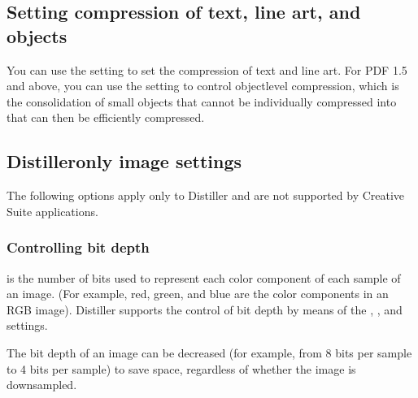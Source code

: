 \documentclass[letterpaper,12pt,english,openany,oneside]{sphinxmanual}
\begin{document}
\subsection{Setting compression of text, line art, and objects}
\label{\detokenize{PDF_Create_UsingSettings:setting-compression-of-text-line-art-and-objects}}
You can use the  setting to set the compression of text and line art. For PDF 1.5 and above, you can use the  setting to control object\sphinxhyphen{}level compression, which is the consolidation of small objects that cannot be individually compressed into  that can then be efficiently compressed.




\subsection{Distiller\sphinxhyphen{}only image settings}
\label{\detokenize{PDF_Create_UsingSettings:distiller-only-image-settings}}
The following options apply only to Distiller and are not supported by Creative Suite applications.




\subsubsection{Controlling bit depth}
\label{\detokenize{PDF_Create_UsingSettings:controlling-bit-depth}}
 is the number of bits used to represent each color component of each sample of an image. (For example, red, green, and blue are the color components in an RGB image). Distiller supports the control of bit depth by means of the  ,  , and  settings.

The bit depth of an image can be decreased (for example, from 8 bits per sample to 4 bits per sample) to save space, regardless of whether the image is downsampled.
\end{document}
